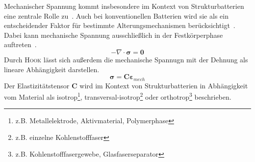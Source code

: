Mechanischer Spannung kommt insbesondere im Kontext von Strukturbatterien eine zentrale Rolle zu~\cite{Carlstedt2020b}. Auch bei konventionellen Batterien wird sie als ein entscheidender Faktor für bestimmte Alterungsmechanismen berücksichtigt~\cite{Mueller2019}. Dabei kann mechanische Spannung ausschließlich in der Festkörperphase auftreten~\cite{Kaliaperumal2021,Berg2022}.
\begin{equation}
    -\nabla \cdot \boldsymbol{\sigma} = \boldsymbol{0}
\end{equation}
Durch \textsc{Hook} lässt sich außerdem die mechanische Spannugn mit der Dehnung als lineare Abhängigkeit darstellen.
\begin{equation}
    \boldsymbol{\sigma} = \boldsymbol{C} \boldsymbol{\varepsilon}_{mech}
\end{equation}
Der Elastizitätstensor $\boldsymbol{C}$ wird im Kontext von Strukturbatterien in Abhängigkeit vom Material als isotrop\footnote{z.B. Metallelektrode, Aktivmaterial, Polymerphase}, transversal-isotrop\footnote{z.B. einzelne Kohlenstofffaser} oder orthotrop\footnote{z.B. Kohlenstofffasergewebe, Glasfaserseparator} beschrieben.
